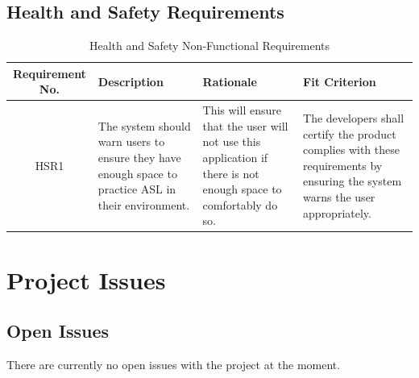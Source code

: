 \documentclass[12pt, titlepage]{article}
\begin{document}
\subsection{Health and Safety Requirements}

\begin{table}[H]
\caption{Health and Safety Non-Functional Requirements}
\noindent \begin{tabular}{| c | p{3cm}| p{3cm}| p{3cm}|}
\hline 
\textbf{Requirement No.} & \textbf{Description} & \textbf{Rationale} & \textbf{Fit Criterion}\\
\hline
HSR1 & The system should warn users to ensure they have enough space to practice ASL in their environment. & This will ensure that the user will not use this application if there is not enough space to comfortably do so. & The developers shall certify the product complies with these requirements by ensuring the system warns the user appropriately. \\
\bottomrule
\end{tabular}
\end{table}

\section{Project Issues}

\subsection{Open Issues}
There are currently no open issues with the project at the moment.
\end{document}
